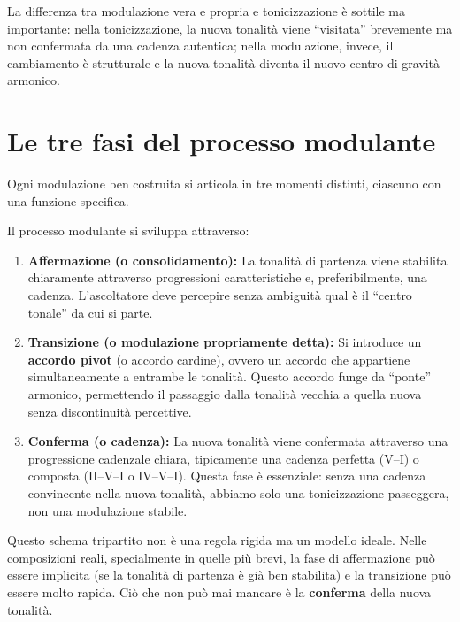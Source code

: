 La differenza tra modulazione vera e propria e tonicizzazione è sottile ma importante: nella tonicizzazione, la nuova tonalità viene ``visitata'' brevemente ma non confermata da una cadenza autentica; nella modulazione, invece, il cambiamento è strutturale e la nuova tonalità diventa il nuovo centro di gravità armonico.

\section{Le tre fasi del processo modulante}
\label{sec:fasi_modulazione}

Ogni modulazione ben costruita si articola in tre momenti distinti, ciascuno con una funzione specifica.

\begin{regola}
	\label{reg:tre_fasi_modulazione}
	Il processo modulante si sviluppa attraverso:
	
	\begin{enumerate}
		\item \textbf{Affermazione (o consolidamento):} La tonalità di partenza viene stabilita chiaramente attraverso progressioni caratteristiche e, preferibilmente, una cadenza. L'ascoltatore deve percepire senza ambiguità qual è il ``centro tonale'' da cui si parte.
		
		\item \textbf{Transizione (o modulazione propriamente detta):} Si introduce un \textbf{accordo pivot} (o accordo cardine), ovvero un accordo che appartiene simultaneamente a entrambe le tonalità. Questo accordo funge da ``ponte'' armonico, permettendo il passaggio dalla tonalità vecchia a quella nuova senza discontinuità percettive.
		
		\item \textbf{Conferma (o cadenza):} La nuova tonalità viene confermata attraverso una progressione cadenzale chiara, tipicamente una cadenza perfetta (V--I) o composta (II--V--I o IV--V--I). Questa fase è essenziale: senza una cadenza convincente nella nuova tonalità, abbiamo solo una tonicizzazione passeggera, non una modulazione stabile.
	\end{enumerate}
\end{regola}

Questo schema tripartito non è una regola rigida ma un modello ideale. Nelle composizioni reali, specialmente in quelle più brevi, la fase di affermazione può essere implicita (se la tonalità di partenza è già ben stabilita) e la transizione può essere molto rapida. Ciò che non può mai mancare è la \textbf{conferma} della nuova tonalità.

